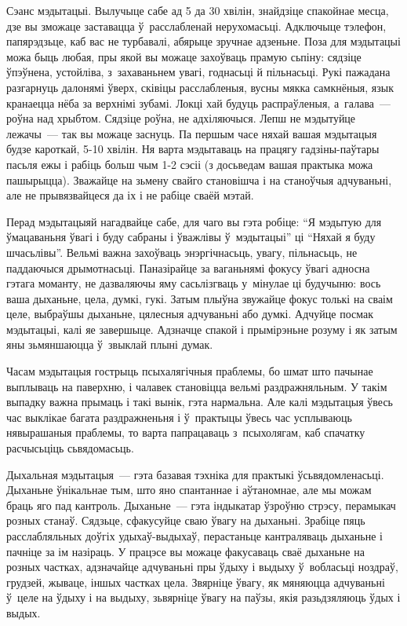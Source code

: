 Сэанс мэдытацыі. Вылучыце сабе ад 5 да 30 хвілін, знайдзіце спакойнае месца, дзе вы зможаце заставацца ў~расслабленай нерухомасьці. Адключыце тэлефон, папярэдзьце, каб вас не турбавалі, абярыце зручнае адзеньне. Поза для мэдытацыі можа быць любая, пры якой вы можаце захоўваць прамую сьпіну: сядзіце ўпэўнена, устойліва, з~захаваньнем увагі, годнасьці й пільнасьці. Рукі пажадана разгарнуць далонямі ўверх, сківіцы расслабленыя, вусны мякка самкнёныя, язык кранаецца нёба за верхнімі зубамі. Локці хай будуць распраўленыя, а~галава~--- роўна над хрыбтом. Сядзіце роўна, не адхіляючыся. Лепш не мэдытуйце лежачы~--- так вы можаце заснуць. Па першым часе няхай вашая мэдытацыя будзе кароткай, 5-10 хвілін. Ня варта мэдытаваць на працягу гадзіны-паўтары пасьля ежы і рабіць больш чым 1-2 сэсіі (з досьведам вашая практыка можа пашырыцца). Зважайце на зьмену свайго становішча і на станоўчыя адчуваньні, але не прывязвайцеся да іх і не рабіце сваёй мэтай. 

Перад мэдытацыяй нагадвайце сабе, для чаго вы гэта робіце: ``Я мэдытую для ўмацаваньня ўвагі і буду сабраны і ўважлівы ў~мэдытацыі'' ці ``Няхай я буду шчасьлівы''. Вельмі важна захоўваць энэргічнасьць, увагу, пільнасьць, не паддаючыся дрымотнасьці. Паназірайце за ваганьнямі фокусу ўвагі адносна гэтага моманту, не дазваляючы яму сасьлізгваць у~мінулае ці будучыню: вось ваша дыханьне, цела, думкі, гукі. Затым плыўна звужайце фокус толькі на сваім целе, выбраўшы дыханьне, цялесныя адчуваньні або думкі. Адчуйце посмак мэдытацыі, калі яе завершыце. Адзначце спакой і прымірэньне розуму і як затым яны зьмяншаюцца ў~звыклай плыні думак.

Часам мэдытацыя гострыць псыхалягічныя праблемы, бо шмат што пачынае выплываць на паверхню, і чалавек становіцца вельмі раздражняльным. У такім выпадку важна прымаць і такі вынік, гэта нармальна. Але калі мэдытацыя ўвесь час выклікае багата раздражненьня і ў~практыцы ўвесь час усплываюць нявырашаныя праблемы, то варта папрацаваць з~псыхолягам, каб спачатку расчысьціць сьвядомасьць.

Дыхальная мэдытацыя~--- гэта базавая тэхніка для практыкі ўсьвядомленасьці. Дыханьне ўнікальнае тым, што яно спантаннае і аўтаномнае, але мы можам браць яго пад кантроль. Дыханьне~--- гэта індыкатар ўзроўню стрэсу, перамыкач розных станаў. Сядзьце, сфакусуйце сваю ўвагу на дыханьні. Зрабіце пяць расслабляльных доўгіх удыхаў-выдыхаў, перастаньце кантраляваць дыханьне і пачніце за ім назіраць. У працэсе вы можаце факусаваць сваё дыханьне на розных частках, адзначайце адчуваньні пры ўдыху і выдыху ў~вобласьці ноздраў, грудзей, жываце, іншых частках цела. Звярніце ўвагу, як мяняюцца адчуваньні ў~целе на ўдыху і на выдыху, зьвярніце ўвагу на паўзы, якія разьдзяляюць ўдых і выдых.

